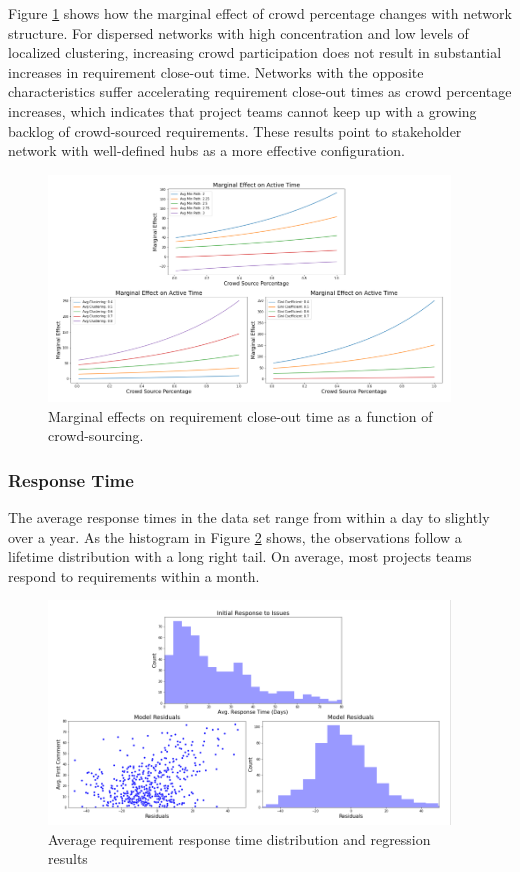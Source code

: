 Figure \ref{active_time_marginal} shows how the marginal effect of crowd percentage changes with network structure. For dispersed networks with high concentration and low levels of localized clustering, increasing crowd participation does not result in substantial increases in requirement close-out time. Networks with the opposite characteristics suffer accelerating requirement close-out times as crowd percentage increases, which indicates that project teams cannot keep up with a growing backlog of crowd-sourced requirements. These results point to stakeholder network with well-defined hubs as a more effective configuration.

\begin{figure}
  \includegraphics[width=0.95\textwidth]{active_time_marginal.PNG}
\caption{Marginal effects on requirement close-out time as a function of crowd-sourcing.}
\label{active_time_marginal}
\end{figure}

\subsubsection{Response Time}

The average response times in the data set range from within a day to slightly over a year. As the histogram in Figure \ref{reaction_time_results} shows, the observations follow a lifetime distribution with a long right tail. On average, most projects teams respond to requirements within a month.

\begin{figure}
  \includegraphics[width=0.95\textwidth]{reaction_time_results.PNG}
\caption{Average requirement response time distribution and regression results}
\label{reaction_time_results}
\end{figure}

